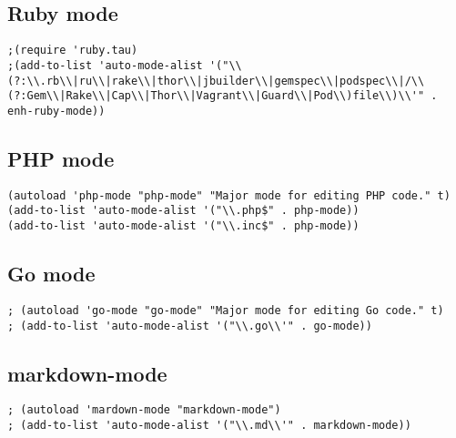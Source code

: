 \documentclass[11pt]{article}
\begin{document}
\subsection*{Ruby mode}
\label{sec:org6b223cc}
\begin{verbatim}
;(require 'ruby.tau)
;(add-to-list 'auto-mode-alist '("\\(?:\\.rb\\|ru\\|rake\\|thor\\|jbuilder\\|gemspec\\|podspec\\|/\\(?:Gem\\|Rake\\|Cap\\|Thor\\|Vagrant\\|Guard\\|Pod\\)file\\)\\'" . enh-ruby-mode))
\end{verbatim}


\subsection*{PHP mode}
\label{sec:org472639a}
\begin{verbatim}
(autoload 'php-mode "php-mode" "Major mode for editing PHP code." t)
(add-to-list 'auto-mode-alist '("\\.php$" . php-mode))
(add-to-list 'auto-mode-alist '("\\.inc$" . php-mode))
\end{verbatim}


\subsection*{Go mode}
\label{sec:org476d16e}
\begin{verbatim}
; (autoload 'go-mode "go-mode" "Major mode for editing Go code." t)
; (add-to-list 'auto-mode-alist '("\\.go\\'" . go-mode))
\end{verbatim}


\subsection*{markdown-mode}
\label{sec:org3cc5bf1}
\begin{verbatim}
; (autoload 'mardown-mode "markdown-mode")
; (add-to-list 'auto-mode-alist '("\\.md\\'" . markdown-mode))
\end{verbatim}
\end{document}
